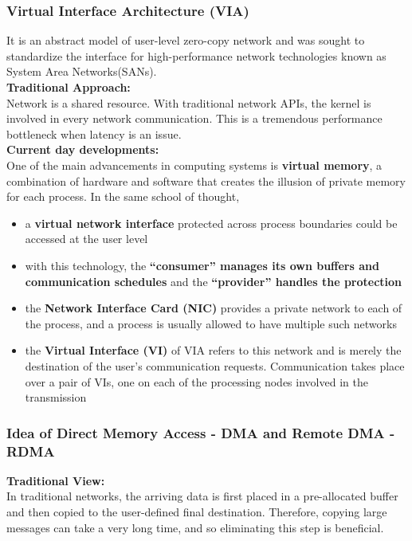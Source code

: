 \documentclass[12pt, a4paper]{report}
\begin{document}
\subsubsection{Virtual Interface Architecture (VIA)}
It is an abstract model of user-level zero-copy network and was sought to standardize the interface for high-performance network technologies known as System
Area Networks(SANs).\\[1em]
{\bfseries{Traditional Approach:}}\\
Network is a shared resource. With traditional network APIs, the kernel is involved in every network communication. This is a tremendous performance bottleneck
when latency is an issue.\\

{\bfseries{Current day developments:}}\\
One of the main advancements in computing systems is {\bfseries{virtual memory}}, a combination of hardware and software that creates the illusion of private 
memory for each process. In the same school of thought,
\begin{itemize}
    \item a {\bfseries{virtual network interface}} protected across process boundaries could be accessed at the user level
    \item with this technology, the {\bfseries{``consumer'' manages its own buffers and communication schedules}} and the {\bfseries{``provider'' handles the 
          protection}}
    \item the {\bfseries{Network Interface Card (NIC)}} provides a private network to each of the process, and a process is usually allowed to have multiple such
          networks
    \item the {\bfseries{Virtual Interface (VI)}} of VIA refers to this network and is merely the destination of the user's communication requests. Communication
          takes place over a pair of VIs, one on each of the processing nodes involved in the transmission
\end{itemize}

\subsubsection{Idea of Direct Memory Access - DMA and Remote DMA - RDMA}
{\bfseries{Traditional View:}}\\
In traditional networks, the arriving data is first placed in a pre-allocated buffer and then copied to the user-defined final destination. Therefore, copying
large messages can take a very long time, and so eliminating this step is beneficial.\\
\end{document}
